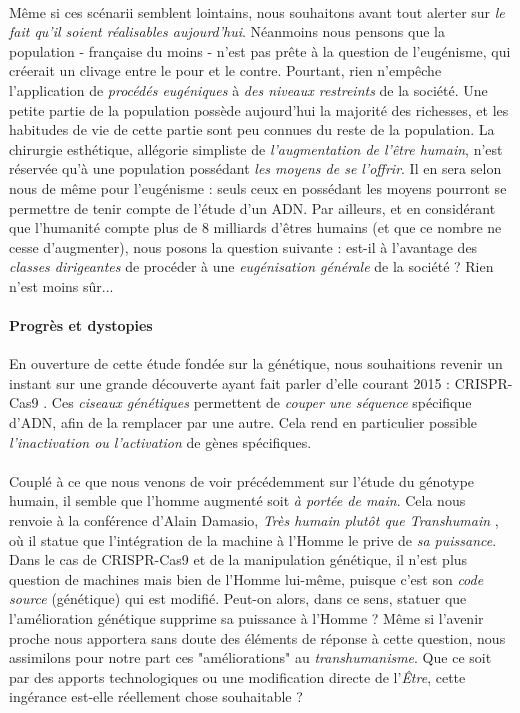 \paragraph{} Même si ces scénarii semblent lointains, nous souhaitons avant tout alerter sur \emph{le fait
qu'il soient réalisables aujourd'hui}. Néanmoins nous pensons que la population - française du moins - n'est
pas prête à la question de l'eugénisme, qui créerait un clivage entre le pour et le contre. Pourtant, rien
n'empêche l'application de \emph{procédés eugéniques} à \emph{des niveaux restreints} de la société. Une
petite partie de la population possède aujourd'hui la majorité des richesses, et les habitudes de vie de
cette partie sont peu connues du reste de la population. La chirurgie esthétique, allégorie simpliste de
\emph{l'augmentation de l'être humain}, n'est réservée qu'à une population possédant \emph{les moyens de se
l'offrir}. Il en sera selon nous de même pour l'eugénisme : seuls ceux en possédant les moyens pourront se
permettre de tenir compte de l'étude d'un ADN. Par ailleurs, et en considérant que l'humanité compte plus
de 8 milliards d'êtres humains (et que ce nombre ne cesse d'augmenter), nous posons la question suivante :
est-il à l'avantage des \emph{classes dirigeantes} de procéder à une \emph{eugénisation générale} de
la société ? Rien n'est moins sûr...

\paragraph{Progrès et dystopies} En ouverture de cette étude fondée sur la génétique, nous souhaitions revenir
un instant sur une grande découverte ayant fait parler d'elle courant 2015 : CRISPR-Cas9 \cite{Genetique0}. Ces
\emph{ciseaux génétiques} permettent de \emph{couper une séquence} spécifique d'ADN, afin de la remplacer par
une autre. Cela rend en particulier possible \emph{l'inactivation ou l'activation} de gènes spécifiques.

\paragraph{} Couplé à ce que nous venons de voir précédemment sur l'étude du génotype humain, il semble que
l'homme augmenté soit \emph{à portée de main}. Cela nous renvoie à la conférence d'Alain Damasio, \emph{Très humain
plutôt que Transhumain} \cite{Damasio2}, où il statue que l'intégration de la machine à l'Homme le prive de \emph{sa 
puissance}. Dans le cas de CRISPR-Cas9 et de la manipulation génétique, il n'est plus question de machines
mais bien de l'Homme lui-même, puisque c'est son \emph{code source} (génétique) qui est modifié. Peut-on alors, dans ce sens,
statuer que l'amélioration génétique supprime sa puissance à l'Homme ? Même si l'avenir proche nous apportera sans doute
des éléments de réponse à cette question, nous assimilons pour notre part ces "améliorations" au \emph{transhumanisme}.
Que ce soit par des apports technologiques ou une modification directe de l'\emph{Être}, cette ingérance est-elle
réellement chose souhaitable ?



